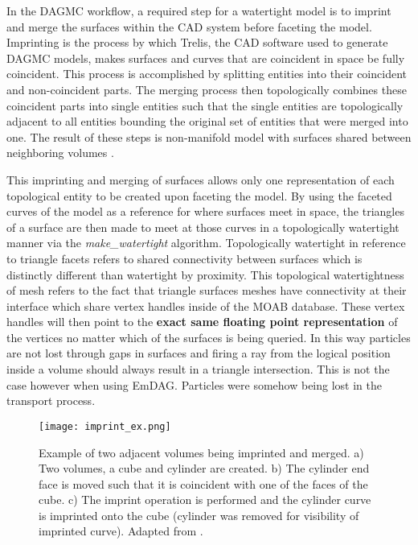 In the DAGMC workflow, a required step for a watertight model is to imprint and
merge the surfaces within the CAD system before faceting the model. Imprinting
is the process by which Trelis, the CAD software used to generate DAGMC models,
makes surfaces and curves that are coincident in space be fully coincident. This
process is accomplished by splitting entities into their coincident and
non-coincident parts. The merging process then topologically combines these
coincident parts into single entities such that the single entities are
topologically adjacent to all entities bounding the original set of entities
that were merged into one. The result of these steps is non-manifold model with
surfaces shared between neighboring volumes \cite{Smith_2011}.

This imprinting and merging of surfaces allows only one representation of each
topological entity to be created upon faceting the model. By using the faceted
curves of the model as a reference for where surfaces meet in space, the
triangles of a surface are then made to meet at those curves in a topologically
watertight manner via the \textit{make\_watertight} algorithm. Topologically
watertight in reference to triangle facets refers to shared connectivity between
surfaces which is distinctly different than watertight by proximity. This
topological watertightness of mesh refers to the fact that triangle surfaces
meshes have connectivity at their interface which share vertex handles inside of
the MOAB database. These vertex handles will then point to the \textbf{exact
  same floating point representation} of the vertices no matter which of the
surfaces is being queried. In this way particles are not lost through gaps in
surfaces and firing a ray from the logical position inside a volume should always
result in a triangle intersection. This is not the case however when using
EmDAG. Particles were somehow being lost in the transport process.

\begin{figure}[H]
  \centering
  \texttt{[image: imprint\_ex.png]}
  \caption{Example of two adjacent volumes being imprinted and merged. a) Two
    volumes, a cube and cylinder are created. b) The cylinder end face is moved
    such that it is coincident with one of the faces of the cube. c) The imprint
    operation is performed and the cylinder curve is imprinted onto the cube
    (cylinder was removed for visibility of imprinted curve). Adapted from
    \cite{White_2002}.}
  \label{imprint_ex}
\end{figure}

